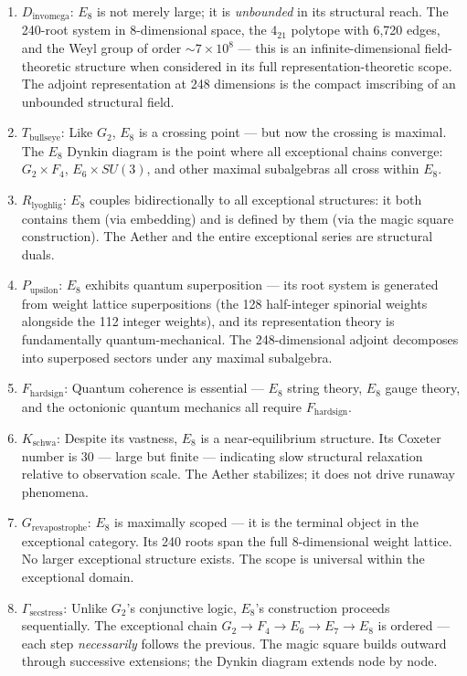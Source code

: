 \documentclass[12pt,a4paper]{article}
\begin{document}
\begin{enumerate}
    \item \textbf{$D_{\text{invomega}}$}: $E_8$ is not merely large; it is \emph{unbounded} in its structural reach. The 240-root system in 8-dimensional space, the $4_{21}$ polytope with 6,720 edges, and the Weyl group of order $\sim 7 \times 10^8$ --- this is an infinite-dimensional field-theoretic structure when considered in its full representation-theoretic scope. The adjoint representation at 248 dimensions is the compact imscribing of an unbounded structural field.
    \item \textbf{$T_{\text{bullseye}}$}: Like $G_2$, $E_8$ is a crossing point --- but now the crossing is maximal. The $E_8$ Dynkin diagram is the point where all exceptional chains converge: $G_2 \times F_4$, $E_6 \times SU(3)$, and other maximal subalgebras all cross within $E_8$.
    \item \textbf{$R_{\text{lyoghlig}}$}: $E_8$ couples bidirectionally to all exceptional structures: it both contains them (via embedding) and is defined by them (via the magic square construction). The Aether and the entire exceptional series are structural duals.
    \item \textbf{$P_{\text{upsilon}}$}: $E_8$ exhibits quantum superposition --- its root system is generated from weight lattice superpositions (the 128 half-integer spinorial weights alongside the 112 integer weights), and its representation theory is fundamentally quantum-mechanical. The 248-dimensional adjoint decomposes into superposed sectors under any maximal subalgebra.
    \item \textbf{$F_{\text{hardsign}}$}: Quantum coherence is essential --- $E_8$ string theory, $E_8$ gauge theory, and the octonionic quantum mechanics all require $F_{\text{hardsign}}$.
    \item \textbf{$K_{\text{schwa}}$}: Despite its vastness, $E_8$ is a near-equilibrium structure. Its Coxeter number is 30 --- large but finite --- indicating slow structural relaxation relative to observation scale. The Aether stabilizes; it does not drive runaway phenomena.
    \item \textbf{$G_{\text{revapostrophe}}$}: $E_8$ is maximally scoped --- it is the terminal object in the exceptional category. Its 240 roots span the full 8-dimensional weight lattice. No larger exceptional structure exists. The scope is universal within the exceptional domain.
    \item \textbf{$\Gamma_{\text{secstress}}$}: Unlike $G_2$'s conjunctive logic, $E_8$'s construction proceeds sequentially. The exceptional chain $G_2 \to F_4 \to E_6 \to E_7 \to E_8$ is ordered --- each step \emph{necessarily} follows the previous. The magic square builds outward through successive extensions; the Dynkin diagram extends node by node.

\end{enumerate}
\end{document}
